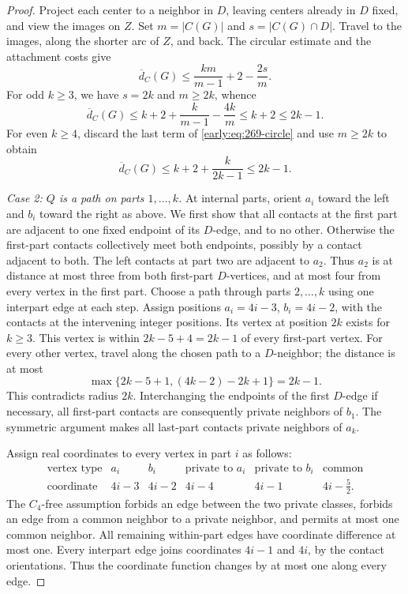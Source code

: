 \documentclass[11pt,a4paper]{article}
\theoremstyle{definition}\newtheorem{definition}[theorem]{Definition}
\theoremstyle{remark}\newtheorem{remark}[theorem]{Remark}
\begin{document}
\begin{proof}
Project each center to a neighbor in $D$, leaving centers already in
$D$ fixed, and view the images on $Z$.  Set $m=|C(G)|$ and
$s=|C(G)\cap D|$.  Travel to the images, along the shorter arc of
$Z$, and back.  The circular estimate and the attachment costs give
\begin{equation}
 \overline d_C(G)\leq
 \frac{km}{m-1}+2-\frac{2s}{m}.
 \label{early:eq:269-circle}
\end{equation}
For odd $k\geq3$, we have $s=2k$ and $m\geq2k$, whence
\[
 \overline d_C(G)\leq k+2+\frac{k}{m-1}-\frac{4k}{m}
 \leq k+2\leq2k-1.
\]
For even $k\geq4$, discard the last term of
\eqref{early:eq:269-circle} and use $m\geq2k$ to obtain
\[
 \overline d_C(G)\leq k+2+\frac{k}{2k-1}\leq2k-1.
\]

\emph{Case 2: $Q$ is a path on parts $1,\ldots,k$.}
At internal parts, orient $a_i$ toward the left and $b_i$ toward the
right as above.  We first show that all contacts at the first part
are adjacent to one fixed endpoint of its $D$-edge, and to no other.
Otherwise the first-part contacts collectively meet both endpoints,
possibly by a contact adjacent to both.  The left contacts at part
two are adjacent to $a_2$.  Thus $a_2$ is at distance at most three
from both first-part $D$-vertices, and at most four from every vertex
in the first part.  Choose a path through parts $2,\ldots,k$ using
one interpart edge at each step.  Assign positions
$a_i=4i-3$, $b_i=4i-2$, with the contacts at the intervening integer
positions.  Its vertex at position $2k$ exists for $k\geq3$.
This vertex is within $2k-5+4=2k-1$ of every first-part vertex.
For every other vertex, travel along the chosen path to a
$D$-neighbor; the distance is at most
\[
 \max\{2k-5+1,(4k-2)-2k+1\}=2k-1.
\]
This contradicts radius $2k$.  Interchanging the endpoints of the
first $D$-edge if necessary, all first-part contacts are consequently
private neighbors of $b_1$.  The symmetric argument makes all
last-part contacts private neighbors of $a_k$.

Assign real coordinates to every vertex in part $i$ as follows:
\[
\begin{array}{c|ccccc}
 \text{vertex type}&a_i&b_i&
 \text{private to }a_i&
 \text{private to }b_i&
 \text{common}\\\hline
 \text{coordinate}&4i-3&4i-2&4i-4&4i-1&4i-\tfrac52.
\end{array}
\]
The $C_4$-free assumption forbids an edge between the two private
classes, forbids an edge from a common neighbor to a private neighbor,
and permits at most one common neighbor.  All remaining within-part
edges have coordinate difference at most one.  Every interpart edge
joins coordinates $4i-1$ and $4i$, by the contact orientations.
Thus the coordinate function changes by at most one along every edge.


\end{proof}
\end{document}
